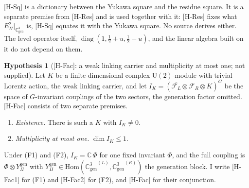 \documentclass[11pt]{article}
\theoremstyle{definition}
\newtheorem{hypothesis}{Hypothesis}
\theoremstyle{remark}
\newcommand{\Cgen}{\mathbb{C}^{3}_{\mathrm{gen}}}
\newcommand{\Epi}{E_{\Pi}}
\newcommand{\GL}{{\Cgen}^{(L)}}
\newcommand{\GR}{{\Cgen}^{(R)}}
\newcommand{\Ygen}{{Y^{\mathrm{gen}}_{\Pi}}}
\newcommand{\UU}{\mathrm{U}}
\newcommand{\diag}{\operatorname{diag}}
\begin{document}
    [H-Sq] is a dictionary between the Yukawa square and the residue square.
    It is a separate premise from [H-Res] and is used together with it: [H-Res] fixes what $\Epi^{2}|_{\Cgen}$ is,
    [H-Sq] equates it with the Yukawa square.
    No source derives either.
    The level operator itself, $\diag(1, \tfrac12 + u, \tfrac12 - u)$, and the linear algebra built on it do not
    depend on them.

    \begin{hypothesis}[{[H-Fac]}: a weak linking carrier and multiplicity at most one; not supplied]
      \label{hyp:factorisation}
      Let $K$ be a finite-dimensional complex $\UU(2)$-module with trivial Lorentz action, the weak linking carrier,
      and let $I_{K} = (\overline{\mathcal{F}_{L}} \otimes \mathcal{F}_{R} \otimes K)^{G}$ be the space of
      $G$-invariant couplings of the two sectors, the generation factor omitted.
      [H-Fac] consists of two separate premises.
      \begin{enumerate}
        \item[\emph{(F1)}] \emph{Existence.} There is such a $K$ with $I_{K} \neq 0$.
        \item[\emph{(F2)}] \emph{Multiplicity at most one.} $\dim I_{K} \leq 1$.
      \end{enumerate}
      Under (F1) and (F2), $I_{K} = \mathbb{C}\,\Phi$ for one fixed invariant $\Phi$, and the full coupling is
      $\Phi \otimes \Ygen$ with $\Ygen \in \mathrm{Hom}(\GL, \GR)$ the generation block.
      I write [H-Fac1] for (F1) and [H-Fac2] for (F2), and [H-Fac] for their conjunction.
    \end{hypothesis}
\end{document}
